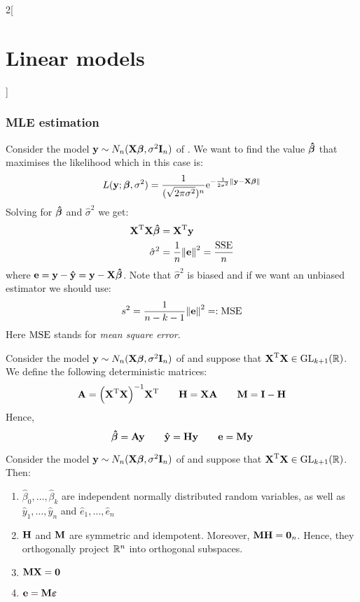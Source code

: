 \documentclass[../../../main_math.tex]{subfiles}
\begin{document}
\begin{multicols}{2}[\section{Linear models}]
  \subsubsection{MLE estimation}
  \begin{proposition}
    Consider the model $\boldsymbol{\mathrm{y}}\sim N_n(\boldsymbol{\mathrm{X\beta}},\sigma^2\boldsymbol{\mathrm{I}}_n)$ of . We want to find the value $\boldsymbol{\mathrm{\hat\beta}}$ that maximises the likelihood which in this case is: $$L(\boldsymbol{\mathrm{y}};\boldsymbol{\mathrm{\beta}},\sigma^2)=\frac{1}{(\sqrt{2\pi\sigma^2})^n}\mathrm{e}^{-\frac{1}{2\sigma^2}{\left\|\boldsymbol{\mathrm{y}}-\boldsymbol{\mathrm{X\beta}}\right\|}}$$
    Solving for $\boldsymbol{\mathrm{\hat\beta}}$ and ${\hat\sigma}^2$ we get:
    \begin{align*}
      {\boldsymbol{\mathrm{X}}}^{\mathrm{T}}\boldsymbol{\mathrm{X\hat\beta}} & ={\boldsymbol{\mathrm{X}}}^{\mathrm{T}}\boldsymbol{\mathrm{y}}                    \\
      {\hat\sigma}^2                    & =\frac{1}{n}{\left\|\boldsymbol{\mathrm{e}}\right\|}^2=\frac{\operatorname{SSE}}{n}
    \end{align*}
    where $\boldsymbol{\mathrm{e}}=\boldsymbol{\mathrm{y}}-\boldsymbol{\mathrm{\hat{y}}}=\boldsymbol{\mathrm{y}}-\boldsymbol{\mathrm{X\hat{\beta}}}$. Note that ${\hat\sigma}^2$ is biased and if we want an unbiased estimator we should use:
    $${s}^2=\frac{1}{n-k-1}{\left\|\boldsymbol{\mathrm{e}}\right\|}^2=:\operatorname{MSE}$$
    Here $\operatorname{MSE}$ stands for \emph{mean square error}.
  \end{proposition}
  \begin{definition}
    Consider the model $\boldsymbol{\mathrm{y}}\sim N_n(\boldsymbol{\mathrm{X\beta}},\sigma^2\boldsymbol{\mathrm{I}}_n)$ of  and suppose that ${\boldsymbol{\mathrm{X}}}^{\mathrm{T}}\boldsymbol{\mathrm{X}}\in\mathrm{GL}_{k+1}(\mathbb{R})$. We define the following deterministic matrices:
    $$\boldsymbol{\mathrm{A}}={\left({\boldsymbol{\mathrm{X}}}^{\mathrm{T}}\boldsymbol{\mathrm{X}}\right)}^{-1}{\boldsymbol{\mathrm{X}}}^{\mathrm{T}}\qquad \boldsymbol{\mathrm{H}}=\boldsymbol{\mathrm{XA}}\qquad \boldsymbol{\mathrm{M}}=\boldsymbol{\mathrm{I}}-\boldsymbol{\mathrm{H}}$$
    Hence, $$\boldsymbol{\mathrm{\hat\beta}}=\boldsymbol{\mathrm{Ay}}\qquad\boldsymbol{\mathrm{\hat{y}}}=\boldsymbol{\mathrm{Hy}}\qquad\boldsymbol{\mathrm{e}}=\boldsymbol{\mathrm{My}}$$
  \end{definition}
  \begin{proposition}
    Consider the model $\boldsymbol{\mathrm{y}}\sim N_n(\boldsymbol{\mathrm{X\beta}},\sigma^2\boldsymbol{\mathrm{I}}_n)$ of  and suppose that ${\boldsymbol{\mathrm{X}}}^{\mathrm{T}}\boldsymbol{\mathrm{X}}\in\mathrm{GL}_{k+1}(\mathbb{R})$. Then:
    \begin{enumerate}
      \item $\hat\beta_0,\ldots,\hat\beta_k$ are independent normally distributed random variables, as well as $\hat{y}_1,\ldots,\hat{y}_n$ and $\hat{e}_1,\ldots,\hat{e}_n$
      \item $\boldsymbol{\mathrm{H}}$ and $\boldsymbol{\mathrm{M}}$ are symmetric and idempotent. Moreover, $\boldsymbol{\mathrm{MH}}=\boldsymbol{\mathrm{0}}_n$. Hence, they orthogonally project $\mathbb{R}^n$ into orthogonal subspaces.
      \item $\boldsymbol{\mathrm{MX}}=\boldsymbol{\mathrm{0}}$
      \item $\boldsymbol{\mathrm{e}}=\boldsymbol{\mathrm{M\varepsilon}}$

\end{enumerate}
\end{proposition}
\end{multicols}
\end{document}
